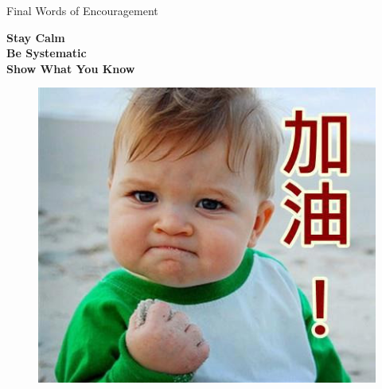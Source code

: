 \documentclass{beamer}
\begin{document}
\begin{frame}{Final Words of Encouragement}
\begin{center}
\Large
\textcolor{ds9gold}{\textbf{Stay Calm}} \\
\textcolor{ds9blue}{\textbf{Be Systematic}} \\
\textcolor{ds9red}{\textbf{Show What You Know}} \\
\end{center}



\begin{figure}
    \centering
    \includegraphics[width=0.5\linewidth]{addoil.jpg}
\end{figure}
\end{frame}
\end{document}
